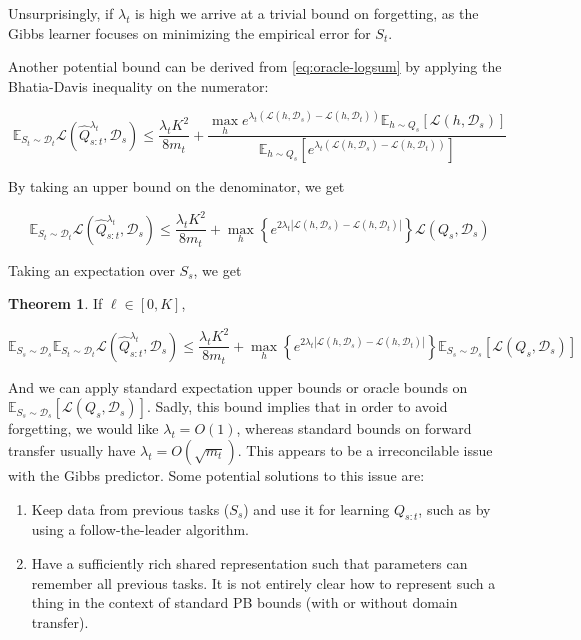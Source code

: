\documentclass[letterpaper]{article}
\theoremstyle{definition}
\newtheorem{theorem}{Theorem}
\begin{document}
Unsurprisingly, if $\lambda_t$ is high we arrive at a trivial bound on forgetting, as the Gibbs learner focuses on minimizing the empirical error for $S_t$.

Another potential bound can be derived from \eqref{eq:oracle-logsum} by applying the Bhatia-Davis inequality on the numerator:

$$\mathbb{E}_{S_t\sim \mathcal{D}_t}\mathcal{L}( \hat{Q}^{\lambda_t}_{s:t},\mathcal{D}_s)\leq \frac{\lambda_t K^2}{8m_t}+\frac{\max_h e^{\lambda_t(\mathcal{L}(h,\mathcal{D}_s)-\mathcal{L}(h,\mathcal{D}_t))}\mathbb{E}_{h\sim Q_s}\left [\mathcal{L}(h,\mathcal{D}_s) \right ]}{\mathbb{E}_{h\sim Q_s}\left [e^{\lambda_t(\mathcal{L}(h,\mathcal{D}_s)-\mathcal{L}(h,\mathcal{D}_t))}\right ]}$$

By taking an upper bound on the denominator, we get 

$$\mathbb{E}_{S_t\sim \mathcal{D}_t}\mathcal{L}( \hat{Q}^{\lambda_t}_{s:t},\mathcal{D}_s)\leq \frac{\lambda_t K^2}{8m_t}+\max_h \left \{ e^{2\lambda_t|\mathcal{L}(h,\mathcal{D}_s)-\mathcal{L}(h,\mathcal{D}_t)|}\right \}\mathcal{L}(Q_s,\mathcal{D}_s)$$

Taking an expectation over $S_s$, we get

\begin{theorem}
If $\ell\in[0,K]$,

\begin{equation}
\mathbb{E}_{S_s\sim \mathcal{D}_s}\mathbb{E}_{S_t\sim \mathcal{D}_t}\mathcal{L}( \hat{Q}^{\lambda_t}_{s:t},\mathcal{D}_s)\leq \frac{\lambda_t K^2}{8m_t}+\max_h \left \{ e^{2\lambda_t|\mathcal{L}(h,\mathcal{D}_s)-\mathcal{L}(h,\mathcal{D}_t)|}\right \}\mathbb{E}_{S_s\sim \mathcal{D}_s}\left [\mathcal{L}(Q_s,\mathcal{D}_s)\right ]
\end{equation}
\end{theorem}

And we can apply standard expectation upper bounds or oracle bounds on $\mathbb{E}_{S_s\sim \mathcal{D}_s}\left [\mathcal{L}(Q_s,\mathcal{D}_s)\right ]$.
Sadly, this  bound implies that in order to avoid forgetting, we would like $\lambda_t=O(1)$, whereas standard bounds on forward transfer usually have $\lambda_t=O(\sqrt{m_t})$. This appears to be a irreconcilable issue with the Gibbs predictor. Some potential solutions to this issue are:

\begin{enumerate}
	\item Keep data from previous tasks ($S_s$) and use it for learning $Q_{s:t}$, such as by using a follow-the-leader algorithm.
	\item Have a sufficiently rich shared representation such that parameters can remember all previous tasks. It is not entirely clear how to represent such a thing in the context of standard PB bounds (with or without domain transfer).
\end{enumerate} 
\end{document}
